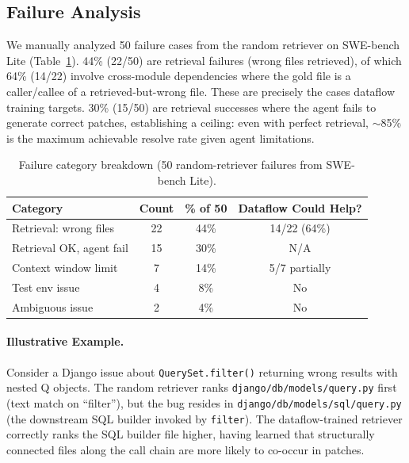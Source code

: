 \documentclass[11pt]{article}
\begin{document}
\subsection{Failure Analysis}
\label{sec:failure}

We manually analyzed 50 failure cases from the random retriever on SWE-bench Lite (Table~\ref{tab:failure}).
44\% (22/50) are retrieval failures (wrong files retrieved), of which 64\% (14/22) involve cross-module dependencies where the gold file is a caller/callee of a retrieved-but-wrong file.
These are precisely the cases dataflow training targets.
30\% (15/50) are retrieval successes where the agent fails to generate correct patches, establishing a ceiling: even with perfect retrieval, $\sim$85\% is the maximum achievable resolve rate given agent limitations.

\begin{table}[h]
\centering
\caption{Failure category breakdown (50 random-retriever failures from SWE-bench Lite).}
\label{tab:failure}
\begin{tabular}{lccc}
\toprule
\textbf{Category} & \textbf{Count} & \textbf{\% of 50} & \textbf{Dataflow Could Help?} \\
\midrule
Retrieval: wrong files & 22 & 44\% & 14/22 (64\%) \\
Retrieval OK, agent fail & 15 & 30\% & N/A \\
Context window limit & 7 & 14\% & 5/7 partially \\
Test env issue & 4 & 8\% & No \\
Ambiguous issue & 2 & 4\% & No \\
\bottomrule
\end{tabular}
\end{table}

\paragraph{Illustrative Example.}
Consider a Django issue about \texttt{QuerySet.filter()} returning wrong results with nested Q objects.
The random retriever ranks \texttt{django/db/models/query.py} first (text match on ``filter''), but the bug resides in \texttt{django/db/models/sql/query.py} (the downstream SQL builder invoked by \texttt{filter}).
The dataflow-trained retriever correctly ranks the SQL builder file higher, having learned that structurally connected files along the call chain are more likely to co-occur in patches.
\end{document}
